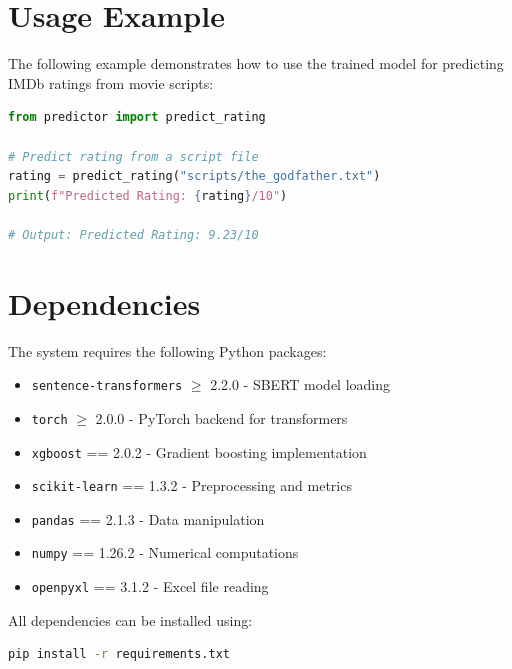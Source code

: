 \section{Usage Example}

The following example demonstrates how to use the trained model for predicting IMDb ratings from movie scripts:

\begin{lstlisting}[language=Python, caption={Prediction Usage Example}]
from predictor import predict_rating

# Predict rating from a script file
rating = predict_rating("scripts/the_godfather.txt")
print(f"Predicted Rating: {rating}/10")

# Output: Predicted Rating: 9.23/10
\end{lstlisting}

\section{Dependencies}

The system requires the following Python packages:

\begin{itemize}
    \item \texttt{sentence-transformers} $\ge$ 2.2.0 - SBERT model loading
    \item \texttt{torch} $\ge$ 2.0.0 - PyTorch backend for transformers
    \item \texttt{xgboost} == 2.0.2 - Gradient boosting implementation
    \item \texttt{scikit-learn} == 1.3.2 - Preprocessing and metrics
    \item \texttt{pandas} == 2.1.3 - Data manipulation
    \item \texttt{numpy} == 1.26.2 - Numerical computations
    \item \texttt{openpyxl} == 3.1.2 - Excel file reading
\end{itemize}

All dependencies can be installed using:
\begin{lstlisting}[language=bash, caption={Installation Command}]
pip install -r requirements.txt
\end{lstlisting}

